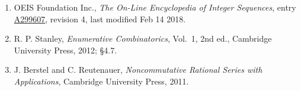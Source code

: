 \documentclass[11pt]{article}
\theoremstyle{definition}
\begin{document}
\begin{enumerate}

\item OEIS Foundation Inc., \emph{The On-Line Encyclopedia of Integer Sequences}, entry \href{https://oeis.org/A299607}{A299607}, revision 4, last modified Feb 14 2018.

\item R. P. Stanley, \emph{Enumerative Combinatorics}, Vol.~1, 2nd ed., Cambridge University Press, 2012; \S4.7.

\item J. Berstel and C. Reutenauer, \emph{Noncommutative Rational Series with Applications}, Cambridge University Press, 2011.

\end{enumerate}
\end{document}
